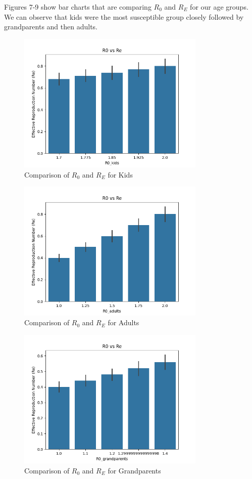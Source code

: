 \documentclass{report}
\begin{document}
Figures 7-9 show bar charts that are comparing \(R_{0}\) and \(R_{E}\) for our age groups. We can observe that kids were the most susceptible group closely followed by grandparents and then adults. 
\begin{figure}[H]
    \centering
    \includegraphics[width=0.8\textwidth]{re_kids.png}
    \caption{Comparison of \(R_{0}\) and \(R_{E}\) for Kids}
    \label{fig:barkids} 
\end{figure}
\begin{figure}[H]
    \centering
    \includegraphics[width=0.8\textwidth]{re_adults.png}
    \caption{Comparison of \(R_{0}\) and \(R_{E}\) for Adults}
    \label{fig:baradults} 
\end{figure}
\begin{figure}[H]
    \centering
    \includegraphics[width=0.8\textwidth]{re_grandparents.png}
    \caption{Comparison of \(R_{0}\) and \(R_{E}\) for Grandparents}
    \label{fig:bargrandparents} 
\end{figure}
\end{document}
